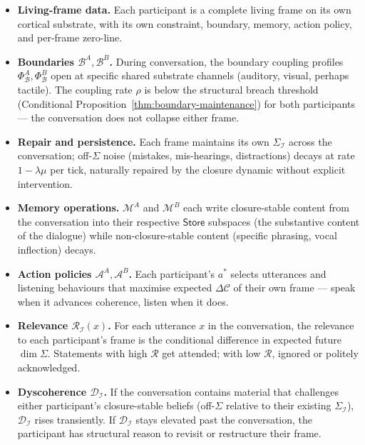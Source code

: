 \documentclass[11pt]{article}
\theoremstyle{plain}
\theoremstyle{definition}
\theoremstyle{remark}
\newcommand{\Ical}{\mathcal{I}}
\newcommand{\Ccal}{\mathcal{C}}
\newcommand{\Mcal}{\mathcal{M}}
\newcommand{\Acal}{\mathcal{A}}
\newcommand{\Bcal}{\mathcal{B}}
\newcommand{\Rcal}{\mathcal{R}}
\newcommand{\Dcal}{\mathcal{D}}
\begin{document}
\begin{itemize}[leftmargin=2em]
\item \textbf{Living-frame data.} Each participant is a complete living frame on its own cortical substrate, with its own constraint, boundary, memory, action policy, and per-frame zero-line.

\item \textbf{Boundaries $\Bcal^A, \Bcal^B$.} During conversation, the boundary coupling profiles $\Phi_\Bcal^A, \Phi_\Bcal^B$ open at specific shared substrate channels (auditory, visual, perhaps tactile). The coupling rate $\rho$ is below the structural breach threshold (Conditional Proposition~\ref{thm:boundary-maintenance}) for both participants --- the conversation does not collapse either frame.

\item \textbf{Repair and persistence.} Each frame maintains its own $\Sigma_\Ical$ across the conversation; off-$\Sigma$ noise (mistakes, mis-hearings, distractions) decays at rate $1 - \lambda \mu$ per tick, naturally repaired by the closure dynamic without explicit intervention.

\item \textbf{Memory operations.} $\Mcal^A$ and $\Mcal^B$ each write closure-stable content from the conversation into their respective $\mathsf{Store}$ subspaces (the substantive content of the dialogue) while non-closure-stable content (specific phrasing, vocal inflection) decays.

\item \textbf{Action policies $\Acal^A, \Acal^B$.} Each participant's $a^*$ selects utterances and listening behaviours that maximise expected $\Delta\Ccal$ of their own frame --- speak when it advances coherence, listen when it does.

\item \textbf{Relevance $\Rcal_\Ical(x)$.} For each utterance $x$ in the conversation, the relevance to each participant's frame is the conditional difference in expected future $\dim\Sigma$. Statements with high $\Rcal$ get attended; with low $\Rcal$, ignored or politely acknowledged.

\item \textbf{Dyscoherence $\Dcal_\Ical$.} If the conversation contains material that challenges either participant's closure-stable beliefs (off-$\Sigma$ relative to their existing $\Sigma_\Ical$), $\Dcal_\Ical$ rises transiently. If $\Dcal_\Ical$ stays elevated past the conversation, the participant has structural reason to revisit or restructure their frame.


\end{itemize}
\end{document}

